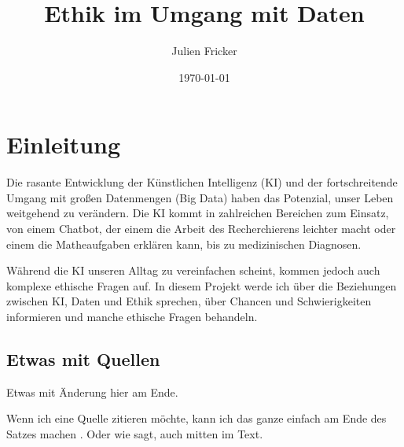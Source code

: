 \documentclass{report}
\title{Ethik im Umgang mit Daten}
\author{Julien Fricker}
\date{\today}
\begin{document}
\maketitle

\tableofcontents

\chapter{Einleitung}

Die rasante Entwicklung der Künstlichen Intelligenz (KI) und der fortschreitende Umgang mit großen Datenmengen (Big Data) haben das Potenzial, unser Leben weitgehend zu verändern. Die KI kommt in zahlreichen Bereichen zum Einsatz, von einem Chatbot, der einem die Arbeit des Recherchierens leichter macht oder einem die Matheaufgaben erklären kann, bis zu medizinischen Diagnosen. 

Während die KI unseren Alltag zu vereinfachen scheint, kommen jedoch auch komplexe ethische Fragen auf. In diesem Projekt werde ich über die Beziehungen zwischen KI, Daten und Ethik sprechen, über Chancen und Schwierigkeiten informieren und manche ethische Fragen behandeln.



\section{Etwas mit Quellen}

Etwas mit Änderung hier am Ende.

Wenn ich eine Quelle zitieren möchte, kann ich das ganze einfach am Ende des Satzes machen \citep{example}. Oder wie \citet{example} sagt, auch mitten im Text.

\printbibliography
\end{document}
